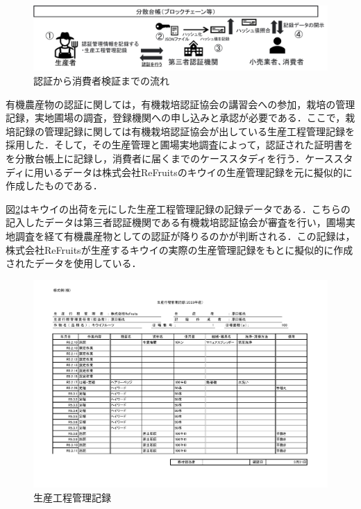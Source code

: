 \documentclass[11pt,dvipdfmx]{jreport}
\begin{document}
\begin{figure}[t]
	\includegraphics[width=1.0\linewidth]{Haraguchi_fig/shikumi.pdf}
	\caption{認証から消費者検証までの流れ}
	\label{fig:blackbox}
\end{figure}


 
有機農産物の認証に関しては，有機栽培認証協会の講習会への参加，栽培の管理記録，実地圃場の調査，登録機関への申し込みと承認が必要である．ここで，栽培記録の管理記録に関しては有機栽培認証協会が出している生産工程管理記録を採用した．そして，その生産管理と圃場実地調査によって，認証された証明書をを分散台帳上に記録し，消費者に届くまでのケーススタディを行う．ケーススタディに用いるデータは株式会社ReFruitsのキウイの生産管理記録を元に擬似的に作成したものである．

図\ref{fig:Teiannsyuhou}はキウイの出荷を元にした生産工程管理記録の記録データである．こちらの記入したデータは第三者認証機関である有機栽培認証協会が審査を行い，圃場実地調査を経て有機農産物としての認証が降りるのかが判断される．この記録は，株式会社ReFruitsが生産するキウイの実際の生産管理記録をもとに擬似的に作成されたデータを使用している．


\begin{figure}[t]
	\includegraphics[width=1.0\linewidth]{Haraguchi_fig/seisannkoutei.pdf}
	\caption{生産工程管理記録}
	\label{fig:Teiannsyuhou}
\end{figure}
\end{document}
